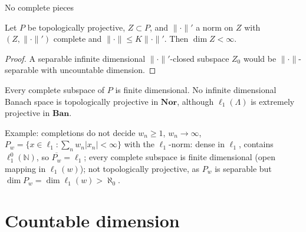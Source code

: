 \documentclass[10pt,aspectratio=169]{beamer}
\newcommand{\Nor}{\mathbf{Nor}}
\newcommand{\Ban}{\mathbf{Ban}}
\newcommand{\lo}[1]{\ell_1^0(#1)}
\newcommand{\ellone}[1]{\ell_1(#1)}
\newcommand{\NN}{\mathbb N}
\begin{document}
\begin{frame}{No complete pieces}
  \begin{corollary}
    Let $P$ be topologically projective, $Z\subset P$, and $\|\cdot\|'$ a norm on
    $Z$ with $(Z,\|\cdot\|')$ complete and $\|\cdot\|\le K\|\cdot\|'$. Then
    $\dim Z<\infty$.
  \end{corollary}
  \begin{proof}
    A separable infinite dimensional $\|\cdot\|'$-closed subspace $Z_0$ would be
    $\|\cdot\|$-separable with uncountable dimension.
  \end{proof}
  Every complete subspace of $P$ is finite dimensional. No infinite dimensional
  Banach space is topologically projective in $\Nor$, although $\ellone\Lambda$
  is extremely projective in $\Ban$.
  \begin{exampleblock}{Example: completions do not decide}
    $w_n\ge1$, $w_n\to\infty$, \
    $P_w=\{x\in\ell_1:\sum_n w_n|x_n|<\infty\}$ with the $\ell_1$-norm:
    dense in $\ell_1$, contains $\lo\NN$, so $\overline{P_w}=\ell_1$;
    every complete subspace is finite dimensional (open mapping in $\ell_1(w)$);
    \alert{not} topologically projective, as $P_w$ is separable but
    $\dim P_w=\dim\ell_1(w)>\aleph_0$.
  \end{exampleblock}
\end{frame}

\section{Countable dimension}
\end{document}
